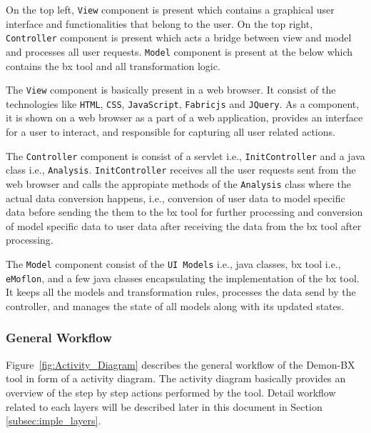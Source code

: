 On the top left, \texttt{View} component is present which contains a graphical user interface and functionalities that belong to the user. On the top right, \texttt{Controller} component is present which acts a bridge between view and model and processes all user requests. \texttt{Model} component is present at the below which contains the bx tool  and all transformation logic.

The \texttt{View} component is basically present in a web browser. It consist of the technologies like \texttt{HTML}, \texttt{CSS}, \texttt{JavaScript}, \texttt{Fabricjs} and \texttt{JQuery}. As a component, it is shown on a web browser as a part of a web application, provides an interface for a user to interact, and responsible for capturing all user related actions.

The \texttt{Controller} component is consist of a servlet i.e., \texttt{InitController} and a java class i.e., \texttt{Analysis}. \texttt{InitController} receives all the user requests sent from the web browser and calls the appropiate methods of the \texttt{Analysis} class where the actual data conversion happens, i.e., conversion of user data to model specific data before sending the them to the bx tool for further processing and conversion of model specific data to user data after receiving the data from the bx tool after processing.

The \texttt{Model} component consist of the \texttt{UI Models} i.e., java classes, bx tool i.e., \texttt{eMoflon}, and a few java classes encapsulating the implementation of the bx tool. It keeps all the models and transformation rules, processes the data send by the controller, and manages the state of all models along with its updated states. 

\subsubsection{General Workflow}\label{subsubsec:generalworkflow}
Figure~\ref{fig:Activity_Diagram} describes the general workflow of the Demon-BX tool in form of a activity diagram. The activity diagram basically provides an overview of the step by step actions performed by the tool. Detail workflow related to each layers will be described later in this document in Section \ref{subsec:imple_layers}.

